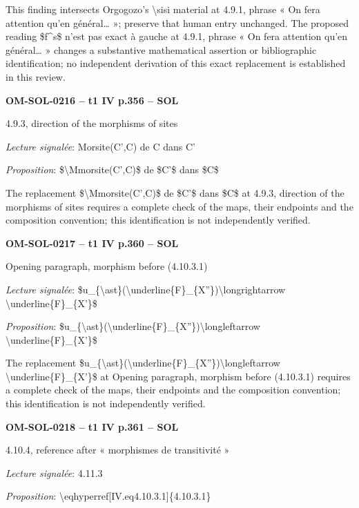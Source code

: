 This finding intersects Orgogozo's \textbackslash{}sisi material at 4.9.1, phrase « On fera attention qu'en général… »; preserve that human entry unchanged. The proposed reading \$f\textasciicircum{}s\$ n'est pas exact à gauche at 4.9.1, phrase « On fera attention qu'en général… » changes a substantive mathematical assertion or bibliographic identification; no independent derivation of this exact replacement is established in this review.\par
\par\noindent\textbf{OM-SOL-0216 -- t1 IV p.356 -- SOL}\par
4.9.3, direction of the morphisms of sites\par
\emph{Lecture signalée}: Morsite(C',C) de C dans C'\par
\emph{Proposition}: \$\textbackslash{}Mmorsite(C',C)\$ de \$C'\$ dans \$C\$\par
The replacement \$\textbackslash{}Mmorsite(C',C)\$ de \$C'\$ dans \$C\$ at 4.9.3, direction of the morphisms of sites requires a complete check of the maps, their endpoints and the composition convention; this identification is not independently verified.\par
\par\noindent\textbf{OM-SOL-0217 -- t1 IV p.360 -- SOL}\par
Opening paragraph, morphism before (4.10.3.1)\par
\emph{Lecture signalée}: \$u\_\{\textbackslash{}ast\}(\textbackslash{}underline\{F\}\_\{X''\})\textbackslash{}longrightarrow \textbackslash{}underline\{F\}\_\{X'\}\$\par
\emph{Proposition}: \$u\_\{\textbackslash{}ast\}(\textbackslash{}underline\{F\}\_\{X''\})\textbackslash{}longleftarrow \textbackslash{}underline\{F\}\_\{X'\}\$\par
The replacement \$u\_\{\textbackslash{}ast\}(\textbackslash{}underline\{F\}\_\{X''\})\textbackslash{}longleftarrow \textbackslash{}underline\{F\}\_\{X'\}\$ at Opening paragraph, morphism before (4.10.3.1) requires a complete check of the maps, their endpoints and the composition convention; this identification is not independently verified.\par
\par\noindent\textbf{OM-SOL-0218 -- t1 IV p.361 -- SOL}\par
4.10.4, reference after « morphismes de transitivité »\par
\emph{Lecture signalée}: 4.11.3\par
\emph{Proposition}: \textbackslash{}eqhyperref[IV.eq4.10.3.1]\{4.10.3.1\}\par
